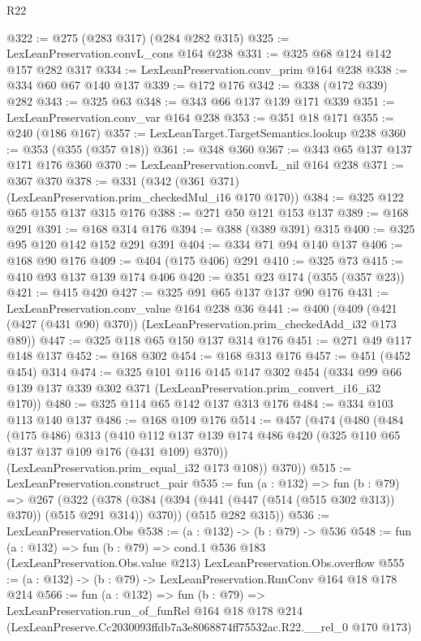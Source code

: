 \begin{lexlean}{R22}
\begin{coremodule}
@322 := @275 (@283 @317) (@284 @282 @315)
@325 := LexLeanPreservation.convL_cons @164 @238
@331 := @325 @68 @124 @142 @157 @282 @317
@334 := LexLeanPreservation.conv_prim @164 @238
@338 := @334 @60 @67 @140 @137
@339 := @172 @176
@342 := @338 (@172 @339) @282
@343 := @325 @63
@348 := @343 @66 @137 @139 @171 @339
@351 := LexLeanPreservation.conv_var @164 @238
@353 := @351 @18 @171
@355 := @240 (@186 @167)
@357 := LexLeanTarget.TargetSemantics.lookup @238
@360 := @353 (@355 (@357 @18))
@361 := @348 @360
@367 := @343 @65 @137 @137 @171 @176 @360
@370 := LexLeanPreservation.convL_nil @164 @238
@371 := @367 @370
@378 := @331 (@342 (@361 @371) (LexLeanPreservation.prim_checkedMul_i16 @170 @170))
@384 := @325 @122 @65 @155 @137 @315 @176
@388 := @271 @50 @121 @153 @137
@389 := @168 @291
@391 := @168 @314 @176
@394 := @388 (@389 @391) @315
@400 := @325 @95 @120 @142 @152 @291 @391
@404 := @334 @71 @94 @140 @137
@406 := @168 @90 @176
@409 := @404 (@175 @406) @291
@410 := @325 @73
@415 := @410 @93 @137 @139 @174 @406
@420 := @351 @23 @174 (@355 (@357 @23))
@421 := @415 @420
@427 := @325 @91 @65 @137 @137 @90 @176
@431 := LexLeanPreservation.conv_value @164 @238 @36
@441 := @400 (@409 (@421 (@427 (@431 @90) @370)) (LexLeanPreservation.prim_checkedAdd_i32 @173 @89))
@447 := @325 @118 @65 @150 @137 @314 @176
@451 := @271 @49 @117 @148 @137
@452 := @168 @302
@454 := @168 @313 @176
@457 := @451 (@452 @454) @314
@474 := @325
    @101
    @116
    @145
    @147
    @302
    @454
    (@334 @99 @66 @139 @137 @339 @302 @371 (LexLeanPreservation.prim_convert_i16_i32 @170))
@480 := @325 @114 @65 @142 @137 @313 @176
@484 := @334 @103 @113 @140 @137
@486 := @168 @109 @176
@514 := @457
    (@474
      (@480
        (@484
          (@175 @486)
          @313
          (@410 @112 @137 @139 @174 @486 @420 (@325 @110 @65 @137 @137 @109 @176 (@431 @109) @370))
          (LexLeanPreservation.prim_equal_i32 @173 @108))
        @370))
@515 := LexLeanPreservation.construct_pair
@535 := fun (a : @132) =>
  fun (b : @79) =>
  @267
    (@322
      (@378 (@384 (@394 (@441 (@447 (@514 (@515 @302 @313)) @370)) (@515 @291 @314)) @370))
      (@515 @282 @315))
@536 := LexLeanPreservation.Obs
@538 := (a : @132) -> (b : @79) -> @536
@548 := fun (a : @132) =>
  fun (b : @79) =>
  cond.{1} @536 @183 (LexLeanPreservation.Obs.value @213) LexLeanPreservation.Obs.overflow
@555 := (a : @132) -> (b : @79) -> LexLeanPreservation.RunConv @164 @18 @178 @214
@566 := fun (a : @132) =>
  fun (b : @79) =>
  LexLeanPreservation.run_of_funRel
    @164
    @18
    @178
    @214
    (LexLeanPreserve.Cc2030093ffdb7a3e8068874ff75532ac.R22.__rel_0 @170 @173)
\end{coremodule}
\end{lexlean}
